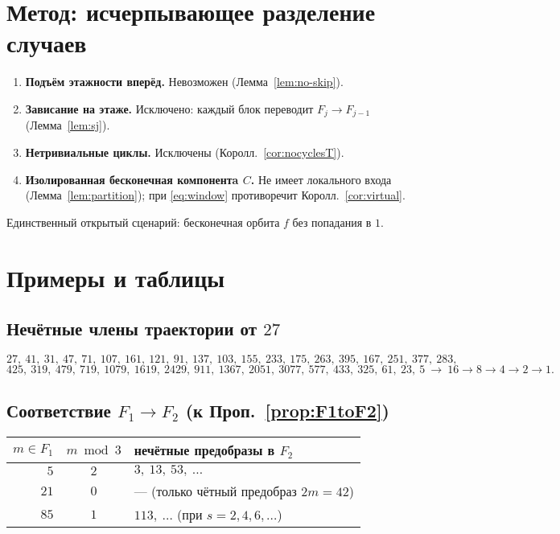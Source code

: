 \documentclass[a4paper,12pt]{article}
\theoremstyle{plain}
\theoremstyle{definition}
\begin{document}
\section{Метод: исчерпывающее разделение случаев}\label{sec:cases}
\begin{enumerate}[label=\textbf{(\alph*)}, leftmargin=2.2em]
\item \textbf{Подъём этажности вперёд.} Невозможен (Лемма~\ref{lem:no-skip}).
\item \textbf{Зависание на этаже.} Исключено: каждый блок переводит $F_j\to F_{j-1}$ (Лемма~\ref{lem:sj}).
\item \textbf{Нетривиальные циклы.} Исключены (Королл.~\ref{cor:nocyclesT}).
\item \textbf{Изолированная бесконечная компонентa $C$.} Не имеет локального входа (Лемма~\ref{lem:partition}); при \eqref{eq:window} противоречит Королл.~\ref{cor:virtual}.
\end{enumerate}
Единственный открытый сценарий: бесконечная орбита $f$ без попадания в $1$.

\section{Примеры и таблицы}\label{sec:examples}
\subsection{Нечётные члены траектории от $27$}
\[
27,\ 41,\ 31,\ 47,\ 71,\ 107,\ 161,\ 121,\ 91,\ 137,\ 103,\ 155,\ 233,\ 175,\ 263,\ 395,\ 167,\ 251,\ 377,\ 283,
\]
\[
425,\ 319,\ 479,\ 719,\ 1079,\ 1619,\ 2429,\ 911,\ 1367,\ 2051,\ 3077,\ 577,\ 433,\ 325,\ 61,\ 23,\ 5\ \to\ 16\to 8\to 4\to 2\to 1.
\]

\subsection{Соответствие $F_1\to F_2$ (к Проп.~\ref{prop:F1toF2})}
\begin{center}
\begin{tabular}{r|c|l}
$m\in F_1$ & $m\bmod3$ & нечётные предобразы в $F_2$ \\ \hline
$5$  & $2$ & $3,\ 13,\ 53,\ \dots$ \\
$21$ & $0$ & — (только чётный предобраз $2m=42$) \\
$85$ & $1$ & $113,\ \dots$ (при $s=2,4,6,\dots$)
\end{tabular}
\end{center}
\end{document}
